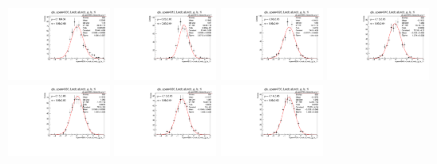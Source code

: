 \begin{figure}[h]\centering
    \includegraphics[width=0.24\textwidth]{figure/io_wo_bkg/gls/pull_gls_epem4600_Lmdc.aLmdc_g_ls_1i.pdf}
    \includegraphics[width=0.24\textwidth]{figure/io_wo_bkg/gls/pull_gls_epem4612_Lmdc.aLmdc_g_ls_1i.pdf}
    \includegraphics[width=0.24\textwidth]{figure/io_wo_bkg/gls/pull_gls_epem4626_Lmdc.aLmdc_g_ls_1i.pdf}
    \includegraphics[width=0.24\textwidth]{figure/io_wo_bkg/gls/pull_gls_epem4640_Lmdc.aLmdc_g_ls_1i.pdf}
    \includegraphics[width=0.24\textwidth]{figure/io_wo_bkg/gls/pull_gls_epem4660_Lmdc.aLmdc_g_ls_1i.pdf}
    \includegraphics[width=0.24\textwidth]{figure/io_wo_bkg/gls/pull_gls_epem4680_Lmdc.aLmdc_g_ls_1i.pdf}
    \includegraphics[width=0.24\textwidth]{figure/io_wo_bkg/gls/pull_gls_epem4700_Lmdc.aLmdc_g_ls_1i.pdf}

\end{figure}
